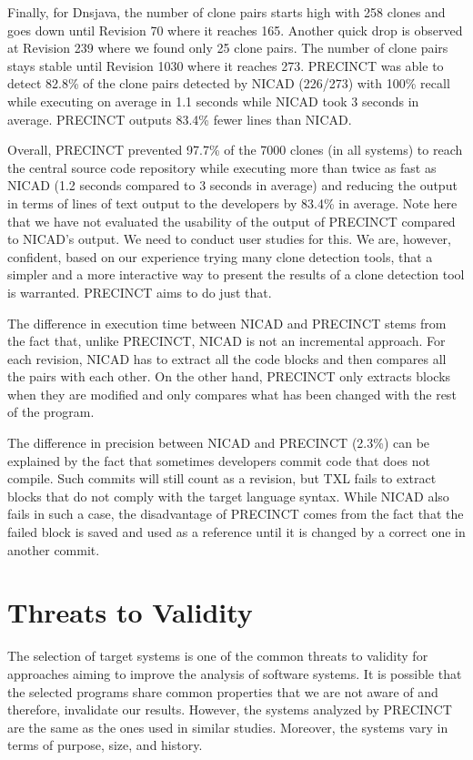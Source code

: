 \documentclass[12pt]{report}
\begin{document}
Finally, for Dnsjava, the number of clone pairs starts high with 258
clones and goes down until Revision 70 where it reaches 165. Another
quick drop is observed at Revision 239 where we found only 25 clone
pairs. The number of clone pairs stays stable until Revision 1030 where
it reaches 273. PRECINCT was able to detect 82.8\% of the clone pairs
detected by NICAD (226/273) with 100\% recall while executing on average
in 1.1 seconds while NICAD took 3 seconds in average. PRECINCT outputs
83.4\% fewer lines than NICAD.

Overall, PRECINCT prevented 97.7\% of the 7000 clones (in all systems)
to reach the central source code repository while executing more than
twice as fast as NICAD (1.2 seconds compared to 3 seconds in average)
and reducing the output in terms of lines of text output to the
developers by 83.4\% in average. Note here that we have not evaluated
the usability of the output of PRECINCT compared to NICAD's output. We
need to conduct user studies for this. We are, however, confident, based
on our experience trying many clone detection tools, that a simpler and
a more interactive way to present the results of a clone detection tool
is warranted. PRECINCT aims to do just that.

The difference in execution time between NICAD and PRECINCT stems from
the fact that, unlike PRECINCT, NICAD is not an incremental approach.
For each revision, NICAD has to extract all the code blocks and then
compares all the pairs with each other. On the other hand, PRECINCT only
extracts blocks when they are modified and only compares what has been
changed with the rest of the program.

The difference in precision between NICAD and PRECINCT (2.3\%) can be
explained by the fact that sometimes developers commit code that does
not compile. Such commits will still count as a revision, but TXL fails
to extract blocks that do not comply with the target language syntax.
While NICAD also fails in such a case, the disadvantage of PRECINCT
comes from the fact that the failed block is saved and used as a
reference until it is changed by a correct one in another commit.

\section{Threats to Validity}\label{threats-to-validity-1}

The selection of target systems is one of the common threats to validity
for approaches aiming to improve the analysis of software systems. It is
possible that the selected programs share common properties that we are
not aware of and therefore, invalidate our results. However, the systems
analyzed by PRECINCT are the same as the ones used in similar studies.
Moreover, the systems vary in terms of purpose, size, and history.
\end{document}
